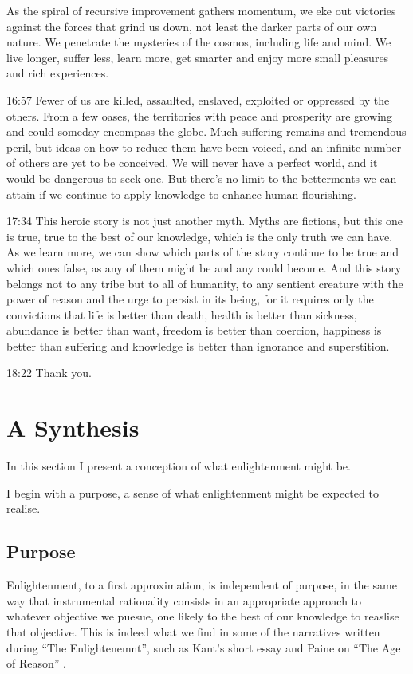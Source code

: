 \documentclass[10pt,titlepage]{book}
\begin{document}
{As the spiral of recursive improvement
gathers momentum,
we eke out victories against the forces that grind us down,
not least the darker parts of our own nature.
We penetrate the mysteries of the cosmos, including life and mind.
We live longer, suffer less, learn more,
get smarter and enjoy more small pleasures
and rich experiences.

16:57
Fewer of us are killed, assaulted, enslaved, exploited
or oppressed by the others.
From a few oases, the territories with peace and prosperity are growing
and could someday encompass the globe.
Much suffering remains
and tremendous peril,
but ideas on how to reduce them have been voiced,
and an infinite number of others are yet to be conceived.
We will never have a perfect world,
and it would be dangerous to seek one.
But there's no limit to the betterments we can attain
if we continue to apply knowledge to enhance human flourishing.

17:34
This heroic story is not just another myth.
Myths are fictions, but this one is true,
true to the best of our knowledge, which is the only truth we can have.
As we learn more,
we can show which parts of the story continue to be true and which ones false,
as any of them might be and any could become.
And this story belongs not to any tribe
but to all of humanity,
to any sentient creature with the power of reason
and the urge to persist in its being,
for it requires only the convictions
that life is better than death,
health is better than sickness,
abundance is better than want,
freedom is better than coercion,
happiness is better than suffering
and knowledge is better than ignorance and superstition.

18:22
Thank you.

}%

\section{A Synthesis}

In this section I present a conception of what enlightenment might be.

I begin with a purpose, a sense of what enlightenment might be expected to realise.

\subsection{Purpose}

Enlightenment, to a first approximation, is independent of purpose, in the same way that instrumental rationality consists in an appropriate approach to whatever objective we puesue, one likely to the best of our knowledge to reaslise that objective.
This is indeed what we find in some of the narratives written during ``The Enlightenemnt'', such as Kant's short essay \cite{kant-en} and Paine on ``The Age of Reason'' \cite{paine-reason}. 
\end{document}
